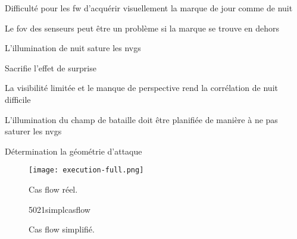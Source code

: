 \begin{e1}
\begin{e2}
\begin{e3}
\begin{e4}
\begin{e5}
\begin{e6}
						\item Difficulté pour les \gls{fw} d'acquérir visuellement la marque de jour comme de nuit
						\item Le \gls{fov} des senseurs peut être un problème si la marque se trouve en dehors
						\item L'illumination de nuit sature les \glspl{nvg}
						\item Sacrifie l'effet de surprise
					\end{e6}
				\end{e5}
				\begin{e5}
					\item La visibilité limitée et le manque de perspective rend la corrélation de nuit difficile
					\item L'illumination du champ de bataille doit être planifiée de manière à ne pas saturer les \glspl{nvg}
				\end{e5}
			\end{e4}
	   	\end{e3}
	\end{e2}
	\item Détermination la géométrie d'attaque 
\end{e1}
	\begin{figure}[H]
		\texttt{[image: execution-full.png]}
		\caption{Cas flow réel.}
		\label{fig:casflow-full}
	\end{figure}
\begin{figure}[H]
	{5021simplcasflow}
	\caption{Cas flow simplifié.}
	\label{fig:casflow} 
\end{figure}


